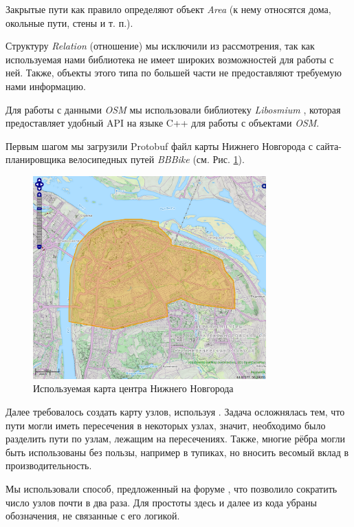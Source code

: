 \documentclass[11pt]{article}
\begin{document}
    	Закрытые пути как правило определяют объект \textit{Area} (к нему относятся дома, окольные пути, стены и т. п.).
    	
    	Структуру \textit{Relation} (отношение) мы исключили из рассмотрения, так как используемая нами библиотека не имеет широких возможностей для работы с ней.
    	Также, объекты этого типа по большей части не предоставляют требуемую нами информацию.
    
	Для работы с данными \textit{OSM} мы использовали библиотеку \textit{Libosmium} \cite{libosm}, которая предоставляет удобный API на языке C++ для работы с объектами \textit{OSM}.
	
	Первым шагом мы загрузили Protobuf файл карты Нижнего Новгорода с сайта-планировщика велосипедных путей \textit{BBBike} \cite{bbbike} (см. Рис. \ref{fig:bbbike}).

	\begin{figure}[ht]
	\centering	
	\includegraphics[width=0.8\textwidth]{images/bbbike.png}
	\caption{Используемая карта центра Нижнего Новгорода}
	\label{fig:bbbike}
	\end{figure}
	
	Далее требовалось создать карту узлов, используя \cite{libosm}.
	Задача осложнялась тем, что пути могли иметь пересечения в некоторых узлах, значит, необходимо было разделить пути по узлам, лежащим на пересечениях.
	Также, многие рёбра могли быть использованы без пользы, например в тупиках, но вносить весомый вклад в производительность.
	
	Мы использовали способ, предложенный на форуме \cite{forum}, что позволило сократить число узлов почти в два раза.
	Для простоты здесь и далее из кода убраны обозначения, не связанные с его логикой.
	
\end{document}
